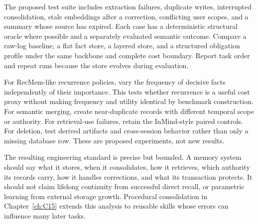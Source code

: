 The proposed test suite includes extraction failures, duplicate writes, interrupted consolidation, stale embeddings after a correction, conflicting user scopes, and a summary whose source has expired. Each case has a deterministic structural oracle where possible and a separately evaluated semantic outcome. Compare a raw-log baseline, a flat fact store, a layered store, and a structured obligation profile under the same backbone and complete cost boundary. Report task order and repeat runs because the store evolves during evaluation.

For RecMem-like recurrence policies, vary the frequency of decisive facts independently of their importance. This tests whether recurrence is a useful cost proxy without making frequency and utility identical by benchmark construction. For semantic merging, create near-duplicate records with different temporal scope or authority. For retrieval-use failures, retain the InMind-style paired controls. For deletion, test derived artifacts and cross-session behavior rather than only a missing database row. These are proposed experiments, not new results.

The resulting engineering standard is precise but bounded. A memory system should say what it stores, when it consolidates, how it retrieves, which authority its records carry, how it handles corrections, and what its transaction protects. It should not claim lifelong continuity from successful direct recall, or parametric learning from external storage growth. Procedural consolidation in Chapter~\ref{ch:C15} extends this analysis to reusable skills whose errors can influence many later tasks.
